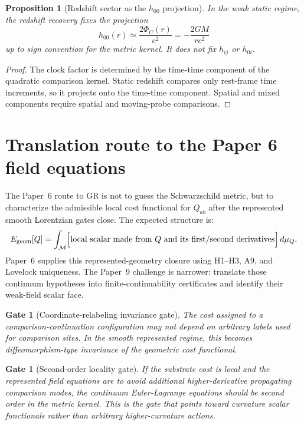 \documentclass[11pt]{article}
\newtheorem{proposition}[theorem]{Proposition}
\newtheorem{gate}[theorem]{Gate}
\theoremstyle{remark}
\newcommand{\Mgeom}{\mathcal M}
\newcommand{\Egeom}{E_{\rm geom}}
\begin{document}
\begin{proposition}[Redshift sector as the \(h_{00}\) projection]
In the weak static regime, the redshift recovery fixes the projection
\[
        h_{00}(r)\simeq \frac{2\Phi_C(r)}{c^2}=-\frac{2GM}{rc^2}
\]
up to sign convention for the metric kernel.  It does not fix \(h_{ij}\) or \(h_{0i}\).
\end{proposition}

\begin{proof}
The clock factor is determined by the time-time component of the quadratic comparison kernel.  Static redshift compares only rest-frame time increments, so it projects onto the time-time component.  Spatial and mixed components require spatial and moving-probe comparisons.
\end{proof}

\section{Translation route to the Paper 6 field equations}

The Paper~6 route to GR is not to guess the Schwarzschild metric, but to characterize the admissible local cost functional for \(Q_{ab}\) after the represented smooth Lorentzian gates close.  The expected structure is:
\[
        \Egeom[Q]
        =\int_{\Mgeom} \Bigl[\text{local scalar made from }Q\text{ and its first/second derivatives}\Bigr]\,d\mu_Q.
\]
Paper~6 supplies this represented-geometry closure using H1--H3, A9, and Lovelock uniqueness.  The Paper~9 challenge is narrower: translate those continuum hypotheses into finite-continuability certificates and identify their weak-field scalar face.

\begin{gate}[Coordinate-relabeling invariance gate]
The cost assigned to a comparison-continuation configuration may not depend on arbitrary labels used for comparison sites.  In the smooth represented regime, this becomes diffeomorphism-type invariance of the geometric cost functional.
\end{gate}

\begin{gate}[Second-order locality gate]
If the substrate cost is local and the represented field equations are to avoid additional higher-derivative propagating comparison modes, the continuum Euler-Lagrange equations should be second order in the metric kernel.  This is the gate that points toward curvature scalar functionals rather than arbitrary higher-curvature actions.
\end{gate}
\end{document}
